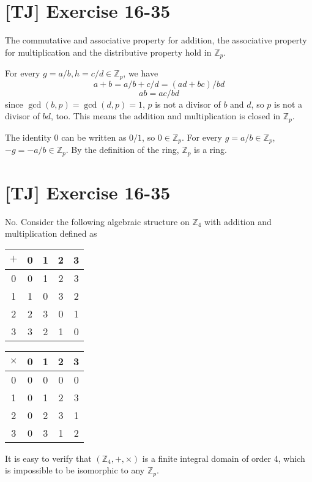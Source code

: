 \documentclass[a4paper,11pt,twocolumn]{article}
\begin{document}
  \section{[TJ] Exercise 16-35}
  The commutative and associative property for addition, the associative property for multiplication and the distributive property hold in $\mathbb{Z}_p$. \par
  For every $g = a/b, h = c/d \in \mathbb{Z}_p$, we have
  $$ a+b = a/b + c/d = (ad + bc)/bd $$
  $$ ab = ac/bd $$
  since $\gcd(b, p) = \gcd(d, p) = 1$, $p$ is not a divisor of $b$ and $d$, so $p$ is not a divisor of $bd$, too. This means the addition and multiplication is closed in $\mathbb{Z}_p$. \par
  The identity 0 can be written as $0 / 1$, so $0 \in \mathbb{Z}_p$. For every $g = a/b \in \mathbb{Z}_p$, $-g = -a/b \in \mathbb{Z}_p$. By the definition of the ring, $\mathbb{Z}_p$ is a ring.

  \section{[TJ] Exercise 16-35}
  No. Consider the following algebraic structure on $\mathbb{Z}_4$ with addition and multiplication defined as \par
  \begin{table}[h]
  \begin{minipage}{0.48\linewidth}
  \begin{tabular}{c|cccc}
    $+$ & 0 & 1 & 2 & 3 \\ \hline
    0 & 0 & 1 & 2 & 3 \\
    1 & 1 & 0 & 3 & 2 \\
    2 & 2 & 3 & 0 & 1 \\
    3 & 3 & 2 & 1 & 0
  \end{tabular}
  \end{minipage}
  \hfill
  \begin{minipage}{0.48\linewidth}
  \begin{tabular}{c|cccc}
    $\times$ & 0 & 1 & 2 & 3 \\ \hline
    0 & 0 & 0 & 0 & 0 \\
    1 & 0 & 1 & 2 & 3 \\
    2 & 0 & 2 & 3 & 1 \\
    3 & 0 & 3 & 1 & 2
  \end{tabular}
  \end{minipage}
  \end{table}
  It is easy to verify that $(\mathbb{Z}_4, +, \times)$ is a finite integral domain of order 4, which is impossible to be isomorphic to any $\mathbb{Z}_p$.
\end{document}
